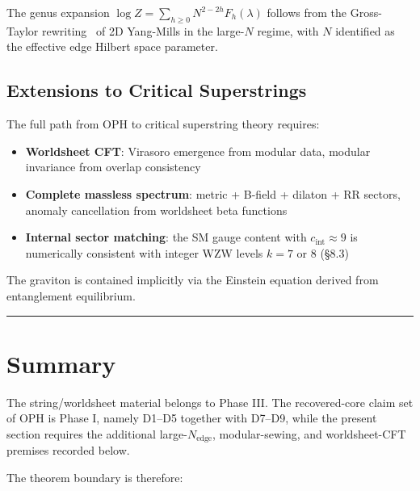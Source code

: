The genus expansion \(\log Z = \sum_{h \geq 0} N^{2-2h} F_h(\lambda)\) follows from the Gross-Taylor rewriting~\cite{grossTaylor93} of 2D Yang-Mills in the large-\(N\) regime, with \(N\) identified as the effective edge Hilbert space parameter.

\subsection{Extensions to Critical Superstrings}\label{92-extensions-to-critical-superstrings}

The full path from OPH to critical superstring theory requires:

\begin{itemize}
\tightlist
\item
  \textbf{Worldsheet CFT}: Virasoro emergence from modular data, modular invariance from overlap consistency
\item
  \textbf{Complete massless spectrum}: metric + B-field + dilaton + RR sectors, anomaly cancellation from worldsheet beta functions
\item
  \textbf{Internal sector matching}: the SM gauge content with \(c_{\text{int}} \approx 9\) is numerically consistent with integer WZW levels \(k = 7\) or \(8\) (\S{}8.3)
\end{itemize}

The graviton is contained implicitly via the Einstein equation derived from entanglement equilibrium.

\begin{center}\rule{0.5\linewidth}{0.5pt}\end{center}

\section{Summary}\label{10-summary}

The string/worldsheet material belongs to Phase III. The recovered-core claim set of OPH is Phase
I, namely D1--D5 together with D7--D9, while the present section requires the additional
large-\(N_{\mathrm{edge}}\), modular-sewing, and worldsheet-CFT premises recorded below.

The theorem boundary is therefore:

